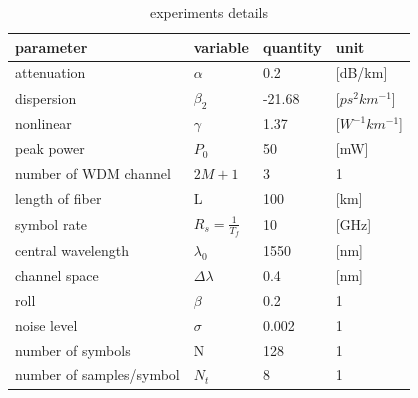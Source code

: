 \begin{table}[htbp]
  \centering
  \begin{tabular}{llll}
  parameter        & variable  & quantity & unit \\
  \hline
  attenuation      & $\alpha$  &   0.2     &  [dB/km]  \\
  \hline
  dispersion       & $\beta_2$ &   -21.68  &   [$ps^2 km^{-1}$]   \\
  \hline
  nonlinear        & $\gamma$  &   1.37   &  [$W^{-1} km^{-1}$]   \\
  \hline
  peak power       & $P_0$     &   50     &  [mW] \\
  \hline
  number of WDM channel& $2M+1$  &    3   &   1 \\
  \hline
  length of fiber  & L         &     100   & [km] \\
  \hline
  symbol rate      & $R_s = \frac{1}{T_f}$ & 10 & [GHz]\\
  \hline
  central wavelength & $\lambda_0$ & 1550  & [nm] \\
  \hline
  channel space      &   $\Delta \lambda $     & 0.4   & [nm] \\
  \hline 
  roll              & $\beta$     & 0.2 & 1 \\
  \hline
  noise level       & $\sigma$    & 0.002 & 1 \\
  \hline
  number of symbols  & N          & 128   & 1 \\
  \hline
  number of samples/symbol & $N_t$ & 8    & 1 \\
  \hline
  \end{tabular}
  \caption{experiments details}
  \label{ex details}
\end{table}


